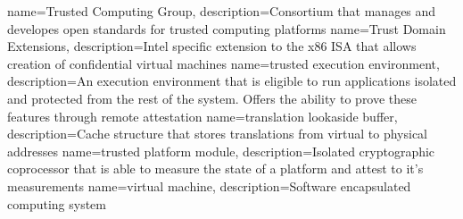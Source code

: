{
    name=Trusted Computing Group,
    description={Consortium that manages and developes open standards for trusted computing platforms}
}
{
    name=Trust Domain Extensions,
    description={Intel specific extension to the x86 ISA that allows creation of confidential virtual machines}
}
{
    name=trusted execution environment,
    description={An execution environment that is eligible to run applications isolated and protected from the rest of
            the system. Offers the ability to prove these features through remote attestation}
}
{
    name=translation lookaside buffer,
    description={Cache structure that stores translations from virtual to physical addresses}
}
{
    name=trusted platform module,
    description={Isolated cryptographic coprocessor that is able to measure the state of a platform and attest to it's measurements}
}
%
{
    name=virtual machine,
    description={Software encapsulated computing system}
}

